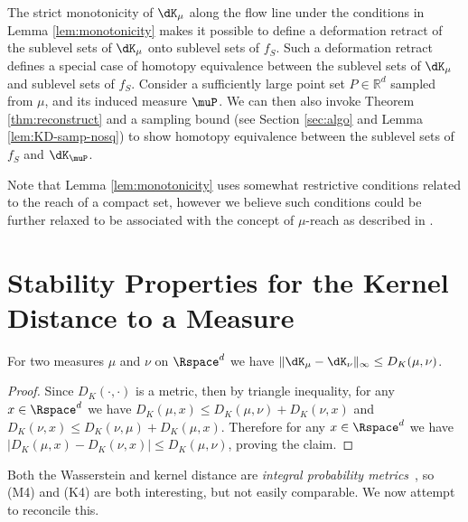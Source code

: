 \documentclass[11pt]{myclass}
\begin{document}
The strict monotonicity of $\dK_\mu$ along the flow line under the conditions in Lemma \ref{lem:monotonicity} makes it possible to define a deformation retract of the sublevel sets of $\dK_\mu$ onto sublevel sets of $f_S$. Such a deformation retract defines a special case of homotopy equivalence between the sublevel sets of $\dK_\mu$ and sublevel sets of $f_S$. 
Consider a sufficiently large point set $P \in \mathbb{R}^d$ sampled from $\mu$, and its induced measure $\muP$.  
We can then also invoke Theorem \ref{thm:reconstruct} and a sampling bound (see Section \ref{sec:algo} and Lemma \ref{lem:KD-samp-nosq}) to show homotopy equivalence between the sublevel sets of $f_S$ and $\dK_\muP$.  



Note that Lemma \ref{lem:monotonicity} uses somewhat restrictive conditions related to the reach of a compact set, however we believe such conditions could be further relaxed to be associated with the concept of $\mu$-reach as described in \cite{ChazalCohen-SteinerLieutier2009}. 


\section{Stability Properties for the Kernel Distance to a Measure}

\begin{lemma}[K4]
For two measures $\mu$ and $\nu$ on $\Rspace^d$ we have
$\| \dK_\mu - \dK_\nu \|_\infty \leq D_K(\mu,\nu)$. 
\end{lemma}
\begin{proof}
Since $D_K(\cdot, \cdot)$ is a metric, then by triangle inequality,  for any $x \in \Rspace^d$ we have 
$D_K(\mu,x) \leq D_K(\mu,\nu) + D_K(\nu,x)$ and 
$D_K(\nu,x) \leq D_K(\nu,\mu) + D_K(\mu, x)$. 
Therefore for any $x \in \Rspace^d$ we have $| D_K(\mu,x) - D_K(\nu,x) | \leq D_K(\mu,\nu)$, proving the claim.  
\end{proof}

Both the Wasserstein and kernel distance are \emph{integral probability metrics}~\cite{SGFSL10}, so (M4) and (K4) are both interesting, but not easily comparable.  We now attempt to reconcile this.  
\end{document}
